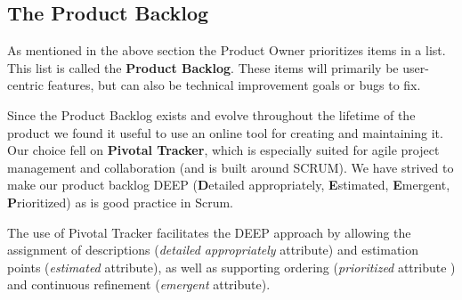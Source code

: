 \subsection{The Product Backlog}

As mentioned in the above section the Product Owner prioritizes items in a list. This list is called the \textbf{Product Backlog}. These items will primarily be user-centric features, but can also be technical improvement goals or bugs to fix.

Since the Product Backlog exists and evolve throughout the lifetime of the product we found it useful to use an online tool for creating and maintaining it. Our choice fell on \textbf{Pivotal Tracker}, which is especially suited for agile project management and collaboration (and is built around SCRUM). We have strived to make our product backlog DEEP (\textbf{D}etailed appropriately, \textbf{E}stimated, \textbf{E}mergent, \textbf{P}rioritized) as is good practice in Scrum.

The use of Pivotal Tracker facilitates the DEEP approach by allowing the assignment of descriptions (\textit{detailed appropriately} attribute) and  estimation points (\textit{estimated} attribute), as well as supporting  ordering (\textit{prioritized} attribute ) and continuous refinement (\textit{emergent} attribute).
